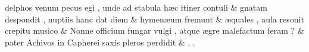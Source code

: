 \documentclass[12pt,onecolumn,twoside,a4paper]{memoir}
\begin{document}
               \begin{pairs}
                  \begin{Leftside}
			\beginnumbering
			\setcounter{stanzaL}{0}
                     
                         \stanza {}
                     delphos
                              venum
                              pecus
                              egi
                              ,
                              unde
                              ad
                              stabula
                              hæc
                              itiner
                              contuli \&
                         \stanza {}
                     gnatam
                              despondit
                              ,
                              nuptiis
                              hanc
                              dat
                              diem \&
                         \stanza {}hymenæum
                              fremunt & 
                     æquales
                              ,
                              aula
                              resonit
                              crepitu
                              musico \&
                         \stanza {}
                     Nonne
                              officium
                              fungar
                              vulgi
                              ,
                              atque
                              ægre
                              malefactum
                              feram
                              ? \&
                         \stanza {}
                     pater
                              Achivos
                              in
                              Capherei
                              saxis
                              pleros
                              perdidit \&
                         \stanza {}.
                              .

\end{Leftside}
\end{pairs}
\end{document}
